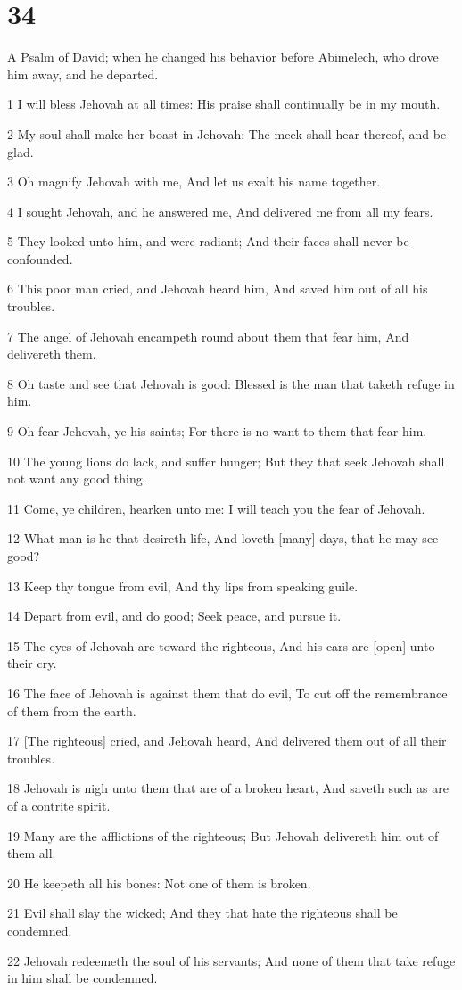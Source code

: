 \chapter{34}

\par A Psalm of David; when he changed his behavior before Abimelech, who drove him away, and he departed.

\par 1 I will bless Jehovah at all times: His praise shall continually be in my mouth.
\par 2 My soul shall make her boast in Jehovah: The meek shall hear thereof, and be glad.
\par 3 Oh magnify Jehovah with me, And let us exalt his name together.
\par 4 I sought Jehovah, and he answered me, And delivered me from all my fears.
\par 5 They looked unto him, and were radiant; And their faces shall never be confounded.
\par 6 This poor man cried, and Jehovah heard him, And saved him out of all his troubles.
\par 7 The angel of Jehovah encampeth round about them that fear him, And delivereth them.
\par 8 Oh taste and see that Jehovah is good: Blessed is the man that taketh refuge in him.
\par 9 Oh fear Jehovah, ye his saints; For there is no want to them that fear him.
\par 10 The young lions do lack, and suffer hunger; But they that seek Jehovah shall not want any good thing.
\par 11 Come, ye children, hearken unto me: I will teach you the fear of Jehovah.
\par 12 What man is he that desireth life, And loveth [many] days, that he may see good?
\par 13 Keep thy tongue from evil, And thy lips from speaking guile.
\par 14 Depart from evil, and do good; Seek peace, and pursue it.
\par 15 The eyes of Jehovah are toward the righteous, And his ears are [open] unto their cry.
\par 16 The face of Jehovah is against them that do evil, To cut off the remembrance of them from the earth.
\par 17 [The righteous] cried, and Jehovah heard, And delivered them out of all their troubles.
\par 18 Jehovah is nigh unto them that are of a broken heart, And saveth such as are of a contrite spirit.
\par 19 Many are the afflictions of the righteous; But Jehovah delivereth him out of them all.
\par 20 He keepeth all his bones: Not one of them is broken.
\par 21 Evil shall slay the wicked; And they that hate the righteous shall be condemned.
\par 22 Jehovah redeemeth the soul of his servants; And none of them that take refuge in him shall be condemned.

